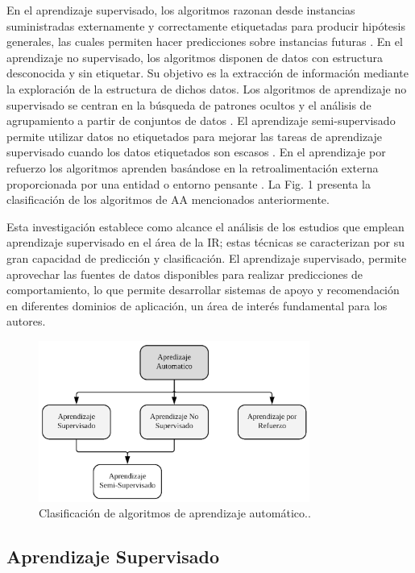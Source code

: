 \documentclass[journal]{IEEEtran}
\begin{document}
En el aprendizaje supervisado, los algoritmos razonan desde instancias suministradas externamente y correctamente etiquetadas para producir hipótesis generales, las cuales permiten hacer predicciones sobre instancias futuras \cite{kotsiantis2007supervised}. En el aprendizaje no supervisado, los algoritmos disponen de datos con estructura desconocida y sin etiquetar. Su objetivo es la extracción de información mediante la exploración de la estructura de dichos datos. Los algoritmos de aprendizaje no supervisado se centran en la búsqueda de patrones ocultos y el análisis de agrupamiento a partir de conjuntos de datos \cite{celebi2016unsupervised}. El aprendizaje semi-supervisado permite utilizar datos no etiquetados para mejorar las tareas de aprendizaje supervisado cuando los datos etiquetados son escasos \cite{Knox2018}. En el aprendizaje por refuerzo los algoritmos aprenden basándose en la retroalimentación externa proporcionada por una entidad o entorno pensante \cite{sutton1998reinforcement}. La Fig. 1 presenta la clasificación de los algoritmos de AA mencionados anteriormente.

Esta investigación establece como alcance el análisis de los estudios que emplean aprendizaje supervisado en el área de la IR; estas técnicas se caracterizan por su gran capacidad de predicción y clasificación. El aprendizaje supervisado, permite aprovechar las fuentes de datos disponibles para realizar predicciones de comportamiento, lo que permite desarrollar sistemas de apoyo y recomendación en diferentes dominios de aplicación, un área de interés fundamental para los autores.

\begin{figure}[!t]
\centering
\includegraphics[width=3.5in]{figures/figure1_Guada.png}
\caption{Clasificación de algoritmos de aprendizaje automático..}
\label{fig1}
\end{figure}

\subsection{Aprendizaje Supervisado}
\end{document}
